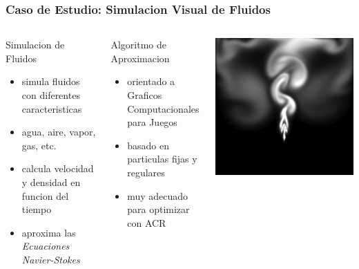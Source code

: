\documentclass{beamer}\usetheme{Madrid} %
\begin{document}
\begin{frame}
\frametitle{Caso de Estudio: Simulacion Visual de Fluidos}
\begin{columns}
\begin{block}{Simulacion de Fluidos}
	\begin{itemize}
		\item simula fluidos con diferentes caracteristicas
		\item agua, aire, vapor, gas, etc.
		\item calcula velocidad y densidad en funcion del tiempo 
		\item aproxima las \textit{Ecuaciones Navier-Stokes}
	\end{itemize}
\end{block}
\begin{block}{Algoritmo de Aproximacion}
\begin{itemize}
\item orientado a Graficos Computacionales para Juegos
\item basado en particulas fijas y regulares
\item muy adecuado para optimizar con ACR
\end{itemize}
\end{block}
\begin{center}
\includegraphics[scale=0.20]{img/saved_ssnapshot.png}

\end{center}
\end{columns}
\end{frame}
\end{document}
